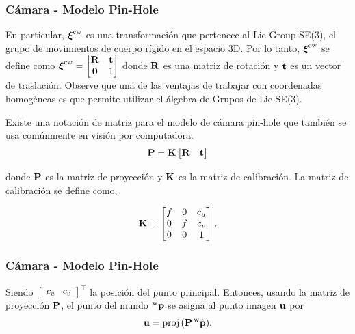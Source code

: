 \begin{frame}
    \frametitle{Cámara - Modelo Pin-Hole}
    
    \footnotesize

    En particular, $\boldsymbol{\mathbf{\xi}}^{\mathrm{c}\mathrm{w}}$ es una transformación que pertenece al Lie Group SE(3), el grupo de movimientos de cuerpo rígido en el espacio 3D. Por lo tanto, $\boldsymbol{\mathbf{\xi}}^{\mathrm{c}\mathrm{w}}$ se define como
    $\boldsymbol{\mathbf{\xi}}^{\mathrm{c}\mathrm{w}}=
    \begin{bmatrix}\boldsymbol{\mathbf{R}} & \boldsymbol{\mathbf{t}}\\
        \boldsymbol{\mathbf{0}} & 1
    \end{bmatrix}$ donde $\boldsymbol{\mathbf{R}}$ es una matriz de rotación y $\boldsymbol{\mathbf{t}}$ es un vector de traslación. Observe que una de las ventajas de trabajar con coordenadas homogéneas es que permite utilizar el álgebra de Grupos de Lie SE(3).
    
    Existe una notación de matriz para el modelo de cámara pin-hole que también se usa comúnmente en visión por computadora.
    \begin{equation*}
        \boldsymbol{\mathbf{P}}=\boldsymbol{\mathbf{K}}\begin{bmatrix}\boldsymbol{\mathbf{R}} & \boldsymbol{\mathbf{t}}\end{bmatrix}
    \end{equation*}

    donde $\boldsymbol{\mathbf{P}}$ es la matriz de proyección y $\boldsymbol{\mathbf{K}}$ es la matriz de calibración. La matriz de calibración se define como,
    
    \begin{equation*}
        \boldsymbol{\mathbf{K}}=
        \begin{bmatrix}f & 0 & c_{u}\\
            0 & f & c_{v}\\
            0 & 0 & 1
        \end{bmatrix},
    \end{equation*}

\end{frame}

\begin{frame}
    \frametitle{Cámara - Modelo Pin-Hole}
    
    \footnotesize

    Siendo $\begin{bmatrix}c_{u} & c_{v}\end{bmatrix}^{\top}$ la posición del punto principal. Entonces, usando la matriz de proyección $\boldsymbol{\mathbf{P}}$, el punto del mundo $\prescript{\mathrm{\mathrm{w}}}{}{\boldsymbol{\mathbf{p}}}$ se asigna al punto imagen $\boldsymbol{\mathbf{u}}$ por
    \begin{equation*}
    \boldsymbol{\mathbf{u}}=\operatorname{proj}{(\boldsymbol{\mathbf{P}}\prescript{\mathrm{\mathrm{w}}}{}{\dot{\boldsymbol{\mathbf{p}}}})}.
    \end{equation*}

\end{frame}


